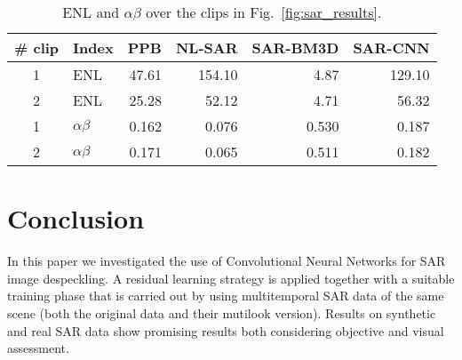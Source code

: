 \documentclass{article}
\begin{document}
\begin{table}
\centering
\caption{ENL and $\alpha\beta$ over the clips in Fig.~\ref{fig:sar_results}.}
\label{ENL_alfabeta}
\small
\begin{tabular}{clrrrr}
\toprule
\# clip & Index & PPB & NL-SAR & SAR-BM3D & SAR-CNN \\
\midrule
1 & ENL           & 47.61 & 154.10 &  4.87 & 129.10 \\
2 & ENL           & 25.28 & 52.12 & 4.71 & 56.32 \\
\midrule
1 & $\alpha\beta$ & 0.162 &  0.076 & 0.530 & 0.187 \\
2 & $\alpha\beta$ & 0.171 & 0.065 & 0.511 & 0.182 \\
\bottomrule
\end{tabular}
\end{table}

\section{Conclusion}

In this paper we investigated the use of Convolutional Neural Networks for SAR image despeckling.
A residual learning strategy is applied together with a suitable training phase
that is carried out by using multitemporal SAR data of the same scene
(both the original data and their mutilook version).
Results on synthetic and real SAR data show promising results both considering objective and
visual assessment.

\small


\end{document}
